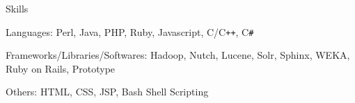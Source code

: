 \documentclass{resume}
\begin{document}
\begin{category}{Skills}{}

    \item {\topic Languages:} Perl, Java, PHP, Ruby, Javascript, C/C{\tt ++}, C{\tt \#}

    \item {\topic Frameworks/Libraries/Softwares:} Hadoop, Nutch, Lucene, Solr, Sphinx,
        WEKA, Ruby on Rails, Prototype

    \item {\topic Others:} HTML, CSS, JSP, Bash Shell Scripting

\end{category}


\end{document}
